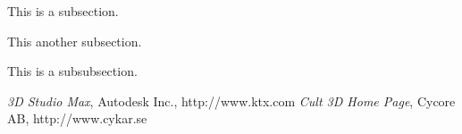 \documentclass[10pt,twocolumn]{article}
\begin{document}

This is a subsection.


This another subsection.


This is a subsubsection.



\begin{thebibliography}{i}
 {\em 3D Studio Max}, Autodesk Inc., http://www.ktx.com
 {\em Cult 3D Home Page}, Cycore AB, http://www.cykar.se

\end{thebibliography}
\end{document}
